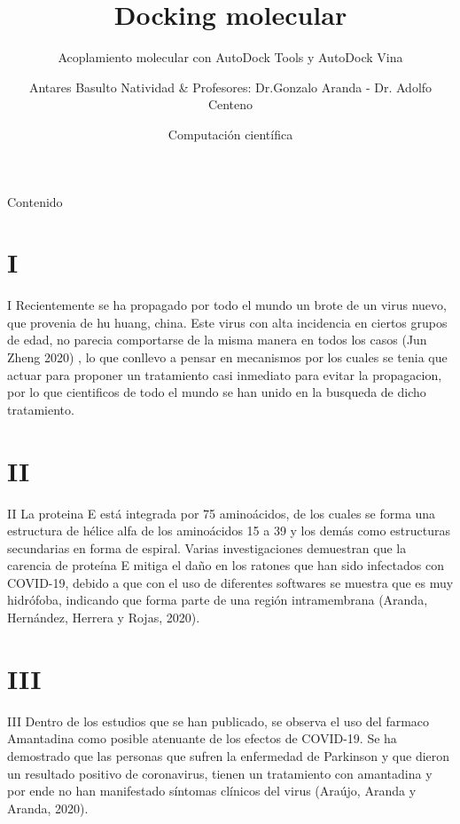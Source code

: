 \documentclass[11pt]{beamer}
\author[Antares]{Antares Basulto Natividad\inst{1} \& Profesores: Dr.Gonzalo Aranda - Dr. Adolfo Centeno  \inst{1}}
\title[Docking molecular]{Docking molecular}
\date{Computación científica }
\subtitle{Acoplamiento molecular con AutoDock Tools y AutoDock Vina}
\institute[UV]{
	\inst{1}
		Universidad Veracruzana. \\Instituto de Investigaciones Cerebrales.\\
		\vspace{2mm}
	
}
\begin{document}
	
	\begin{frame}
		\maketitle
	\end{frame}

	\begin{frame}{Contenido}
		\tableofcontents
	\end{frame}

	\section {I}
		\begin{frame}{I}
			\justifying Recientemente se ha propagado por todo el mundo un brote de un virus nuevo, que provenia de hu huang, china. Este virus con alta incidencia en ciertos grupos de edad, no parecia comportarse de la misma manera en todos los casos (Jun Zheng 2020)  , lo que conllevo a pensar en mecanismos por los cuales se tenia que actuar para proponer un tratamiento casi inmediato para evitar la propagacion, por lo que cientificos de todo el mundo se han unido en la busqueda de dicho tratamiento.
		\end{frame}
	
	\section{II}
		\begin{frame}{II}
			\justifying La proteina E está integrada por 75 aminoácidos, de los cuales se forma una estructura de hélice alfa de los aminoácidos 15 a 39 y los demás como estructuras secundarias en forma de espiral.
Varias investigaciones demuestran que la carencia de proteína E mitiga el daño en los ratones que han sido infectados con COVID-19, debido a que con el uso de diferentes softwares se muestra que es muy hidrófoba, indicando que forma parte de una región intramembrana (Aranda, Hernández, Herrera y Rojas, 2020). 
			\end{frame}
			
			
	
	\section{III}
		\begin{frame}{III}
			\justifying Dentro de los estudios que se han publicado, se observa el uso del farmaco Amantadina como posible atenuante de los efectos de COVID-19. Se ha demostrado que las personas que sufren la enfermedad de Parkinson y que dieron un resultado positivo de coronavirus, tienen un tratamiento con amantadina y por ende no han manifestado síntomas clínicos del virus (Araújo, Aranda y Aranda, 2020).
		\end{frame}
	
\end{document}
